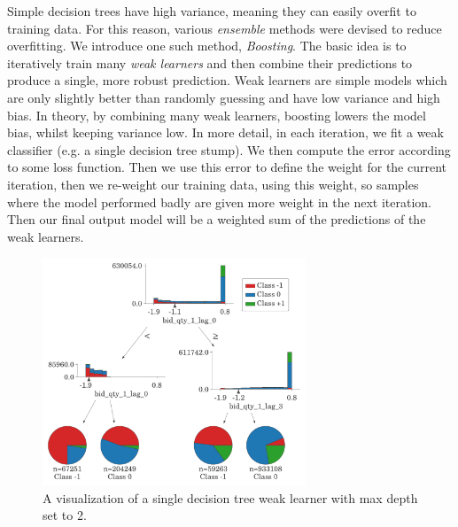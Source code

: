 Simple decision trees have high variance, meaning they can easily overfit to training data.
For this reason, various \textit{ensemble} methods were devised to reduce overfitting.
We introduce one such method, \textit{Boosting}. The basic idea is to iteratively train many \textit{weak learners}
and then combine their predictions to produce a single, more robust prediction. Weak learners are simple models
which are only slightly better than randomly guessing and 
have low variance and high bias. In theory, by combining many weak learners, 
boosting lowers the model bias, whilst keeping variance low.
In more detail, in each iteration, we fit a weak classifier (e.g. a single decision tree stump).
We then compute the error according to some loss function. Then we use this error to define the weight for the current iteration,
then we re-weight our training data, using this weight, so samples where the model performed badly are given more weight in the next iteration.
Then our final output model will be a weighted sum of the predictions of the weak learners.

\begin{figure}[ht]
    \centering
    \includegraphics[width=0.7\textwidth]{./images/xgb_viz.pdf}
    \caption{A visualization of a single decision tree weak learner with max depth set to 2.}
    \label{fig:weaklearner}
\end{figure}

